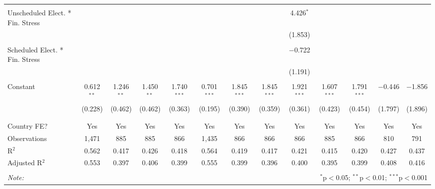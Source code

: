 \begin{table}[!htbp]
\begin{tabular}{@{\extracolsep{5pt}}lcccccccccccc}
  & & & & & & & & & & & & \\ 
 Unscheduled Elect. * Fin. Stress &  &  &  &  &  &  &  & 4.426$^{*}$ &  &  &  &  \\ 
  &  &  &  &  &  &  &  & (1.853) &  &  &  &  \\ 
  & & & & & & & & & & & & \\ 
 Scheduled Elect. * Fin. Stress &  &  &  &  &  &  &  & $-$0.722 &  &  &  &  \\ 
  &  &  &  &  &  &  &  & (1.191) &  &  &  &  \\ 
  & & & & & & & & & & & & \\ 
 Constant & 0.612$^{**}$ & 1.246$^{**}$ & 1.450$^{**}$ & 1.740$^{***}$ & 0.701$^{***}$ & 1.845$^{***}$ & 1.845$^{***}$ & 1.921$^{***}$ & 1.607$^{***}$ & 1.791$^{***}$ & $-$0.446 & $-$1.856 \\ 
  & (0.228) & (0.462) & (0.462) & (0.363) & (0.195) & (0.390) & (0.359) & (0.361) & (0.423) & (0.454) & (1.797) & (1.896) \\ 
  & & & & & & & & & & & & \\ 
\hline \\[-1.8ex] 
Country FE? & Yes & Yes & Yes & Yes & Yes & Yes & Yes & Yes & Yes & Yes & Yes & Yes \\ 
Observations & 1,471 & 885 & 885 & 866 & 1,435 & 866 & 866 & 866 & 885 & 866 & 810 & 791 \\ 
R$^{2}$ & 0.562 & 0.417 & 0.426 & 0.418 & 0.564 & 0.419 & 0.417 & 0.421 & 0.415 & 0.420 & 0.427 & 0.437 \\ 
Adjusted R$^{2}$ & 0.553 & 0.397 & 0.406 & 0.399 & 0.555 & 0.399 & 0.396 & 0.400 & 0.395 & 0.399 & 0.408 & 0.416 \\ 
\hline 
\hline \\[-1.8ex] 
\textit{Note:}  & \multicolumn{12}{r}{$^{*}$p$<$0.05; $^{**}$p$<$0.01; $^{***}$p$<$0.001} \\ 
\end{tabular} 
\end{table} 
